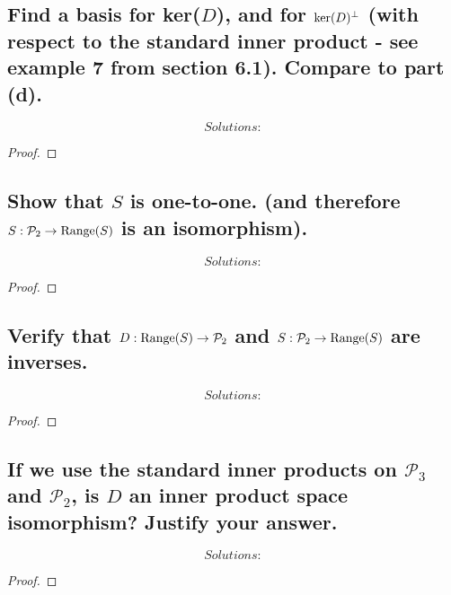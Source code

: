 \documentclass[../main.tex]{subfiles}
\begin{document}
\subsection{Find a basis for ker($D$), and for ${\rm ker}(D)^{\perp}$ (with respect to the standard inner product - see example 7 from section 6.1). Compare to part (d).}
\begin{equation*}
        \boxed{ Solutions:}
\end{equation*}
\begin{proof}
\end{proof}
\subsection{Show that $S$ is one-to-one. (and therefore $S: \mathcal{P}_2 \to {\rm Range}(S)$ is an isomorphism).}
\begin{equation*}
        \boxed{ Solutions:}
\end{equation*}
\begin{proof}
\end{proof}
\subsection{Verify that $D: {\rm Range}(S) \to \mathcal{P}_2$ and $S: \mathcal{P}_2 \to {\rm Range}(S)$ are inverses.}
\begin{equation*}
        \boxed{ Solutions:}
\end{equation*}
\begin{proof}
\end{proof}
\subsection{If we use the standard inner products on $\mathcal{P}_3$ and $\mathcal{P}_2$, is $D$ an inner product space isomorphism? Justify your answer.}
\begin{equation*}
        \boxed{ Solutions:}
\end{equation*}
\begin{proof}
\end{proof}
\end{document}
